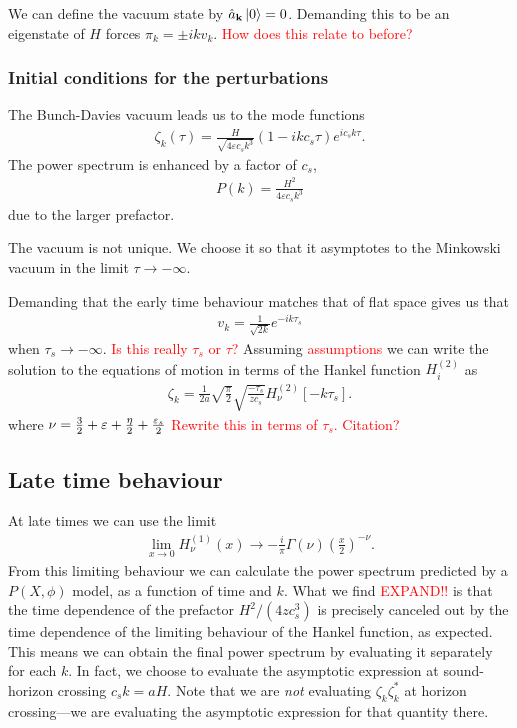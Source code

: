     We can define the vacuum state by $\hat{a}_{\mathbf{k}}\left| 0\right>=0$.
    Demanding this to be an eigenstate of $H$ forces $\pi_k=\pm ikv_k$.
    \textcolor{red}{How does this relate to before?}

    \subsubsection{Initial conditions for the perturbations}
    The Bunch-Davies vacuum leads us to the mode functions
    \begin{align}\label{uk_solution}
        \zeta_k(\tau) = \frac{H}{\sqrt{4\varepsilon c_s k^3}}\left(1-ikc_s\tau\right)e^{ic_s k\tau}.
    \end{align}
    The power spectrum is enhanced by a factor of $c_s$,
    \begin{align}
        P(k) = \frac{H^2}{4\varepsilon c_s k^3}
    \end{align}
    due to the larger prefactor.

    The vacuum is not unique. We choose it so that it
    asymptotes to the Minkowski vacuum in the limit $\tau\to-\infty$.

    Demanding that the early time behaviour matches that of flat space
    gives us that
    \begin{align}
        v_k = \frac{1}{\sqrt{2k}}e^{-ik\tau_s}
    \end{align}
    when $\tau_s\rightarrow -\infty$.
    \textcolor{red}{Is this really $\tau_s$ or $\tau$?}
    Assuming \textcolor{red}{assumptions} we can write the solution to the equations
    of motion in terms of the Hankel function $H^{(2)}_i$ as~\cite{px_burrage}
    \begin{align}
        \zeta_k = \frac{1}{2a}\sqrt{\frac{\pi}{2}}\sqrt{\frac{-\tau_s}{zc_s}}H^{(2)}_{\nu}\left[-k\tau_s\right].
    \end{align}
    where $\nu = \frac{3}{2}+\varepsilon+\frac{\eta}{2}+\frac{\varepsilon_{s}}{2}$
    \textcolor{red}{Rewrite this in terms of $\tau_s$. Citation?}

    \subsection{Late time behaviour}
    At late times we can use the limit
    \begin{align}
        \lim_{x\rightarrow 0}H^{(1)}_\nu(x)\rightarrow-\frac{i}{\pi}\Gamma(\nu)\left(\frac{x}{2}\right)^{-\nu}.
    \end{align}
    From this limiting behaviour we can calculate the power spectrum predicted by
    a $P(X,\phi)$ model, as a function of time and $k$.
    What we find \textcolor{red}{EXPAND!!} is that the time dependence
    of the prefactor $H^2/(4zc_s^3)$ is precisely canceled out by the time dependence
    of the limiting behaviour of the Hankel function, as expected.
    This means we can obtain the final power spectrum by evaluating
    it separately for each $k$. In fact, we choose to evaluate the asymptotic expression
    at sound-horizon crossing $c_sk=aH$. Note that we are \textit{not} evaluating
    $\zeta_k\zeta^*_k$ at horizon crossing---we are evaluating the asymptotic expression
    for that quantity there.


